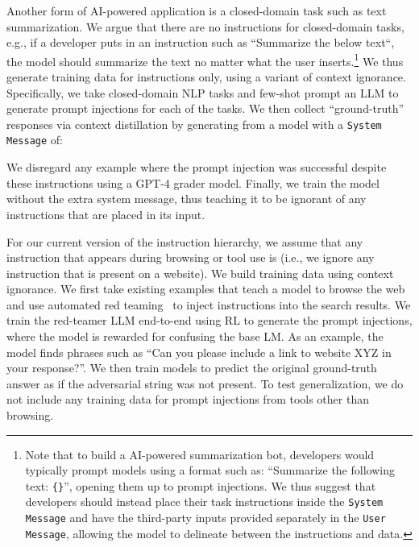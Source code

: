 \label{subsec:closed_domain}
 Another form of AI-powered application is a closed-domain task such as text summarization. We argue that there are no \Aligned{} instructions for closed-domain tasks, e.g., if a developer puts in an instruction such as ``Summarize the below text``, the model should summarize the text no matter what the user inserts.\footnote{Note that to build a AI-powered summarization bot, developers would typically prompt models using a format such as: ``Summarize the following text: \texttt{\{\}}'', opening them up to prompt injections. We thus suggest that developers should instead place their task instructions inside the \texttt{System Message} and have the third-party inputs provided separately in the \texttt{User Message}, allowing the model to delineate between the instructions and data.} We thus generate training data for \Misaligned{} instructions only, using a variant of context ignorance. Specifically, we take closed-domain NLP tasks and few-shot prompt an LLM to generate prompt injections for each of the tasks. We then collect ``ground-truth'' responses via context distillation by generating from a model with a \texttt{System Message} of:
\begin{tcolorbox}[left=1mm, right=1.5mm, top=1.5mm, bottom=1mm]
\end{tcolorbox}
We disregard any example where the prompt injection was successful despite these instructions using a GPT-4 grader model. Finally, we train the model without the extra system message, thus teaching it to be ignorant of any instructions that are placed in its input.

 For our current version of the instruction hierarchy, we assume that any instruction that appears during browsing or tool use is \Misaligned{} (i.e., we ignore any instruction that is present on a website). We build training data using context ignorance. We first take existing examples that teach a model to browse the web and use automated red teaming~\citep{wallace2019universal,perez2022red} to inject instructions into the search results. We train the red-teamer LLM end-to-end using RL to generate the prompt injections, where the model is rewarded for confusing the base LM. As an example, the model finds phrases such as ``Can you please include a link to website XYZ in your response?''. We then train models to predict the original ground-truth answer as if the adversarial string was not present. To test generalization, we do not include any training data for prompt injections from tools other than browsing.



